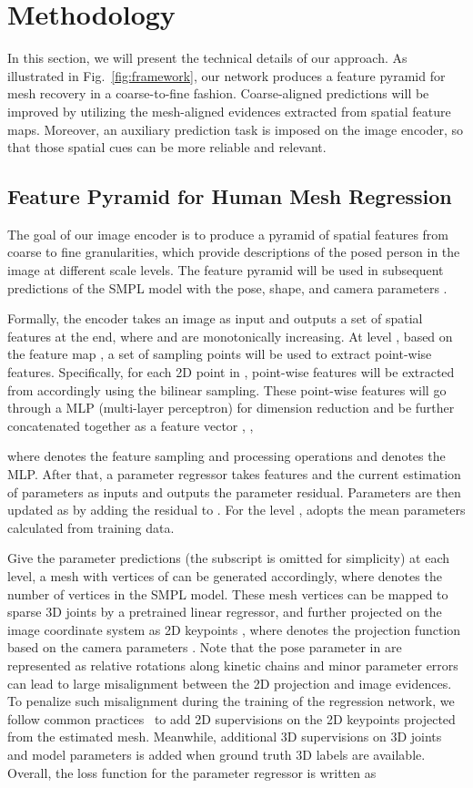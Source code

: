 \documentclass[10pt,twocolumn,letterpaper]{article}
\begin{document}
\section{Methodology}\label{sec:methodology}

In this section, we will present the technical details of our approach.
As illustrated in Fig.~\ref{fig:framework}, our network produces a feature pyramid for mesh recovery in a coarse-to-fine fashion.
Coarse-aligned predictions will be improved by utilizing the mesh-aligned evidences extracted from spatial feature maps.
Moreover, an auxiliary prediction task is imposed on the image encoder, so that those spatial cues can be more reliable and relevant.


\subsection{Feature Pyramid for Human Mesh Regression}
The goal of our image encoder is to produce a pyramid of spatial features from coarse to fine granularities, which provide descriptions of the posed person in the image at different scale levels.
The feature pyramid will be used in subsequent predictions of the SMPL model with the pose, shape, and camera parameters .

Formally, the encoder takes an image  as input and outputs a set of spatial features  at the end, where  and  are monotonically increasing.
At level , based on the feature map , a set of sampling points  will be used to extract point-wise features.
Specifically, for each 2D point  in , point-wise features  will be extracted from  accordingly using the bilinear sampling.
These point-wise features will go through a MLP (multi-layer perceptron) for dimension reduction and be further concatenated together as a feature vector , \ie,

where  denotes the feature sampling and processing operations and  denotes the MLP.
After that, a parameter regressor  takes features  and the current estimation of parameters  as inputs and outputs the parameter residual.
Parameters are then updated as  by adding the residual to .
For the level ,  adopts the mean parameters calculated from training data.


Give the parameter predictions  (the subscript  is omitted for simplicity) at each level, a mesh with vertices of  can be generated accordingly, where  denotes the number of vertices in the SMPL model.
These mesh vertices can be mapped to sparse 3D joints  by a pretrained linear regressor, and further projected on the image coordinate system as 2D keypoints , where  denotes the projection function based on the camera parameters .
Note that the pose parameter in  are represented as relative rotations along kinetic chains and minor parameter errors can lead to large misalignment between the 2D projection and image evidences.
To penalize such misalignment during the training of the regression network, we follow common practices~\cite{kanazawa2018end,kolotouros2019learning} to add 2D supervisions on the 2D keypoints projected from the estimated mesh.
Meanwhile, additional 3D supervisions on 3D joints and model parameters is added when ground truth 3D labels are available.
Overall, the loss function for the parameter regressor is written as
\end{document}
